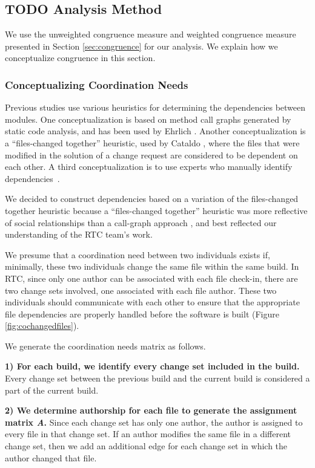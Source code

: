 \subsection{TODO Analysis Method}
\label{sec:analysis}
We use the unweighted congruence measure and weighted congruence measure presented in Section \ref{sec:congruence} for our analysis. We explain how we conceptualize congruence in this section.

\subsubsection{Conceptualizing Coordination Needs}
Previous studies use various heuristics for determining the dependencies between modules. One conceptualization is based on method call graphs generated by static code analysis, and has been used by Ehrlich \cite{ehrlich2008:gaps}.  Another conceptualization is a ``files-changed together'' heuristic, used by Cataldo \cite{cataldo:cscw:2006}, where the files that were modified in the solution of a change request are considered to be dependent on each other. A third conceptualization is to use experts who manually identify dependencies~\cite{gokpinar2010}.

We decided to construct dependencies based on a variation of the files-changed together heuristic because a ``files-changed together'' heuristic was more reflective of social relationships than a call-graph approach \cite{cataldo:esem:2008}, and best reflected our understanding of the RTC team's work.

We presume that a coordination need between two individuals exists if, minimally, these two individuals change the same file within the same build. In RTC, since only one author can be associated with each file check-in, there are two change sets involved, one associated with each file author. These two individuals should communicate with each other to ensure that the appropriate file dependencies are properly handled before the software is built (Figure \ref{fig:cochangedfiles}).

We generate the coordination needs matrix as follows.

\textbf{1) For each build, we identify every change set included in the build.} Every change set between the previous build and the current build is considered a part of the current build.

\textbf{2) We determine authorship for each file to generate the assignment matrix \emph{A}.} Since each change set has only one author, the author is assigned to every file in that change set. If an author modifies the same file in a different change set, then we add an additional edge for each change set in which the author changed that file.

